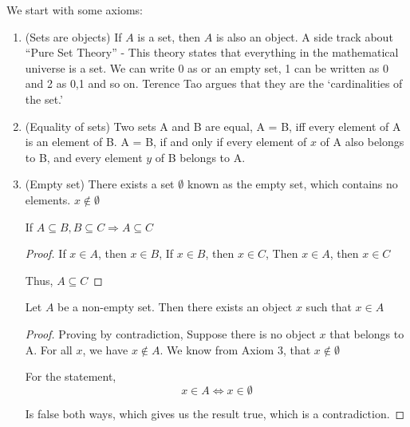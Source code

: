 \documentclass[11pt]{report}
\begin{document}
We start with some axioms:
\begin{enumerate}
	\item (Sets are objects) If $A$ is a set, then $A$ is also an object.
	      A side track about ``Pure Set Theory'' - This theory states that everything in the mathematical universe is a set. We can write 0 as {} or an empty set, 1 can be written as {0} and 2 as {0,1} and so on. Terence Tao argues that they are the `cardinalities of the set.'
	\item (Equality of sets) Two sets A and B are equal, A = B, iff every element of A is an element of B. A = B, if and only if every element of $x$ of A also belongs to B, and every element $y$ of B belongs to A.
	\item (Empty set) There exists a set $\emptyset$ known as the empty set, which contains no elements. $x \notin \emptyset$
	      \begin{prop}
		      If $A \subseteq B, B \subseteq C \Rightarrow A \subseteq C$
	      \end{prop}
	      \begin{proof}
		      If $x \in A$, then $x \in B$,
		      If $x \in B$, then $x \in C$,
		      Then $x \in A$, then $x \in C$

		      Thus, $A \subseteq C$
	      \end{proof}
	      \begin{lemma}
		      Let $A$ be a non-empty set. Then there exists an object $x$ such that $x \in A$
	      \end{lemma}
	      \begin{proof}
		      Proving by contradiction,
		      Suppose there is no object $x$ that belongs to A. For all $x$, we have $x \notin A$. We know from Axiom 3, that $x \notin \emptyset$

		      For the statement,
		      $$ x \in A \Leftrightarrow x \in \emptyset $$

		      Is false both ways, which gives us the result true, which is a contradiction.


\end{proof}
\end{enumerate}
\end{document}
